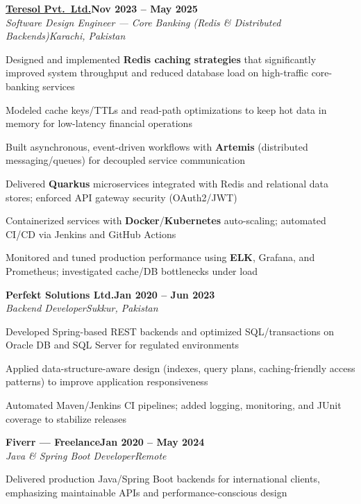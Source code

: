 \documentclass[letterpaper,10pt]{article}
\newcommand{\heading}[2]{
  \hspace{8pt}#1\hfill#2\\
}
\newcommand{\headingBf}[2]{
  \heading{\textbf{#1}}{\textbf{#2}}
}
\newcommand{\headingIt}[2]{
  \heading{\textit{#1}}{\textit{#2}}
}
\newenvironment{resume_list}{
  \vspace{-6pt}
  \begin{itemize}[itemsep=-1px, parsep=0.5pt, topsep=1pt, leftmargin=22pt]
}{
  \end{itemize}
  \vspace{-2pt}
}
\begin{document}
\vspace{2pt}
\headingBf{\href{https://teresol.com/}{Teresol Pvt.\ Ltd.}}{Nov 2023 -- May 2025}
\headingIt{Software Design Engineer --- Core Banking (Redis \& Distributed Backends)}{Karachi, Pakistan}
\begin{resume_list}
  \item Designed and implemented \textbf{Redis caching strategies} that significantly improved system throughput and reduced database load on high-traffic core-banking services
  \item Modeled cache keys/TTLs and read-path optimizations to keep hot data in memory for low-latency financial operations
  \item Built asynchronous, event-driven workflows with \textbf{Artemis} (distributed messaging/queues) for decoupled service communication
  \item Delivered \textbf{Quarkus} microservices integrated with Redis and relational data stores; enforced API gateway security (OAuth2/JWT)
  \item Containerized services with \textbf{Docker}/\textbf{Kubernetes} auto-scaling; automated CI/CD via Jenkins and GitHub Actions
  \item Monitored and tuned production performance using \textbf{ELK}, Grafana, and Prometheus; investigated cache/DB bottlenecks under load
\end{resume_list}

\vspace{2pt}
\headingBf{Perfekt Solutions Ltd.}{Jan 2020 -- Jun 2023}
\headingIt{Backend Developer}{Sukkur, Pakistan}
\begin{resume_list}
  \item Developed Spring-based REST backends and optimized SQL/transactions on Oracle DB and SQL Server for regulated environments
  \item Applied data-structure-aware design (indexes, query plans, caching-friendly access patterns) to improve application responsiveness
  \item Automated Maven/Jenkins CI pipelines; added logging, monitoring, and JUnit coverage to stabilize releases
\end{resume_list}

\vspace{2pt}
\headingBf{Fiverr --- Freelance}{Jan 2020 -- May 2024}
\headingIt{Java \& Spring Boot Developer}{Remote}
\begin{resume_list}
  \item Delivered production Java/Spring Boot backends for international clients, emphasizing maintainable APIs and performance-conscious design
\end{resume_list}
\end{document}
